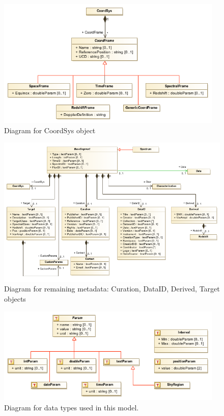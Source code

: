 \documentclass[11pt]{article}
\begin{document}
\begin{figure}[h]
  \begin{center}
  \includegraphics[width=4.25in]{diagrams/coordsys.png}
  \caption{Diagram for CoordSys object}
  \end{center}
\end{figure}

\begin{figure}[h]
  \begin{center}
  \includegraphics[width=6.0in]{diagrams/dataset.png}
  \caption{Diagram for remaining metadata: Curation, DataID, Derived, Target objects}
  \end{center}
\end{figure}

\begin{figure}[h]
  \begin{center}
  \includegraphics[width=4.25in]{diagrams/datatypes.png}
  \caption{Diagram for data types used in this model.}
  \end{center}
\end{figure}
\end{document}
